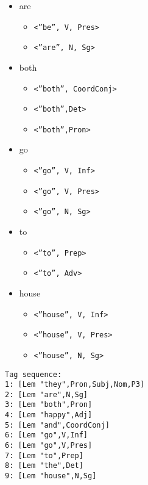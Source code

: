 \documentclass[a4paper, 11pt]{article}
\begin{document}
\begin{itemize}
\item[] are
\begin{itemize}
\item[] \texttt{<''be'', V, Pres>}
\item[] \texttt{<''are'', N, Sg>}
\end{itemize}

\item[] both
\begin{itemize}
\item[] \texttt{<''both'', CoordConj>}
\item[] \texttt{<''both'',Det>}
\item[] \texttt{<''both'',Pron>}
\end{itemize}


\item[] go
\begin{itemize}
\item[] \texttt{<''go'', V, Inf>}
\item[] \texttt{<''go'', V, Pres>}
\item[] \texttt{<''go'', N, Sg>}
\end{itemize}

\item[] to
\begin{itemize}
\item[] \texttt{<''to'', Prep>}
\item[] \texttt{<''to'', Adv>}
\end{itemize}

\item[] house
\begin{itemize}
\item[] \texttt{<''house'', V, Inf>}
\item[] \texttt{<''house'', V, Pres>}
\item[] \texttt{<''house'', N, Sg>}
\end{itemize}
\end{itemize}

\begin{verbatim}
Tag sequence:
1: [Lem "they",Pron,Subj,Nom,P3]
2: [Lem "are",N,Sg]
3: [Lem "both",Pron]
4: [Lem "happy",Adj]
5: [Lem "and",CoordConj]
6: [Lem "go",V,Inf]
6: [Lem "go",V,Pres]
7: [Lem "to",Prep]
8: [Lem "the",Det]
9: [Lem "house",N,Sg]
\end{verbatim}


%
%
\end{document}
